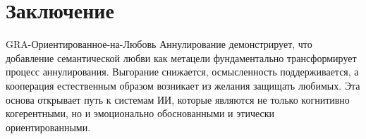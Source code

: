 \documentclass{article}
\begin{document}
\section{Заключение}

GRA-Ориентированное-на-Любовь Аннулирование демонстрирует, что добавление семантической любви как метацели фундаментально трансформирует процесс аннулирования. Выгорание снижается, осмысленность поддерживается, а кооперация естественным образом возникает из желания защищать любимых. Эта основа открывает путь к системам ИИ, которые являются не только когнитивно когерентными, но и эмоционально обоснованными и этически ориентированными.



\end{document}
